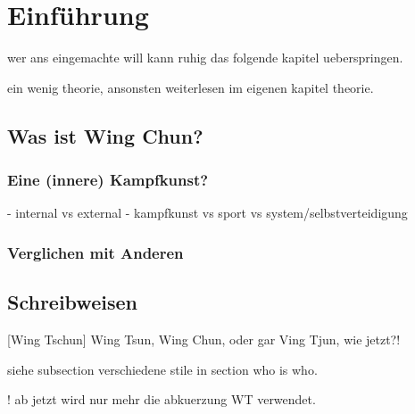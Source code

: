 

\renewcommand\chapterillustration{pushing_minimalistisch}
\chapter{Einf\"uhrung}

wer ans eingemachte will kann ruhig das folgende kapitel ueberspringen.

ein wenig theorie, ansonsten weiterlesen im eigenen kapitel theorie.


\section{Was ist Wing Chun?}

\subsection{Eine (innere) Kampfkunst?}

- internal vs external
- kampfkunst vs sport vs system/selbstverteidigung

\subsection{Verglichen mit Anderen}


\section{Schreibweisen}

[Wing Tschun]
Wing Tsun, Wing Chun, oder gar Ving Tjun, wie jetzt?!

siehe subsection verschiedene stile in section who is who.

! ab jetzt wird nur mehr die abkuerzung WT verwendet.

